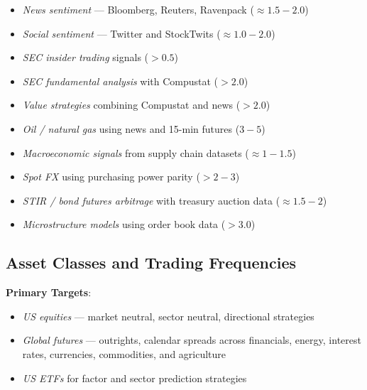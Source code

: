 \documentclass[11pt, letterpaper]{article}
\begin{document}
  \begin{itemize}
    \item \textit{News sentiment} --- Bloomberg, Reuters, Ravenpack
      ($\approx 1.5-2.0$)

    \item \textit{Social sentiment} --- Twitter and StockTwits
      ($\approx 1.0-2.0$)

    \item \textit{SEC insider trading} signals ($> 0.5$)

    \item \textit{SEC fundamental analysis} with Compustat ($> 2.0$)

    \item \textit{Value strategies} combining Compustat and news
      ($> 2.0$)

    \item \textit{Oil / natural gas} using news and 15-min futures
      ($3-5$)

    \item \textit{Macroeconomic signals} from supply chain datasets
      ($\approx 1-1.5$)

    \item \textit{Spot FX} using purchasing power parity ($> 2-3$)

    \item \textit{STIR / bond futures arbitrage} with treasury auction data
      ($\approx 1.5-2$)

    \item \textit{Microstructure models} using order book data ($> 3.0$)
  \end{itemize}

  \subsection{Asset Classes and Trading Frequencies}
  \label{asset-classes-and-trading-frequencies}

  \textbf{Primary Targets}:

  \begin{itemize}
    \item \textit{US equities} --- market neutral, sector neutral, directional
      strategies

    \item \textit{Global futures} --- outrights, calendar spreads across
      financials, energy, interest rates, currencies, commodities, and
      agriculture

    \item \textit{US ETFs} for factor and sector prediction strategies
  \end{itemize}
\end{document}

